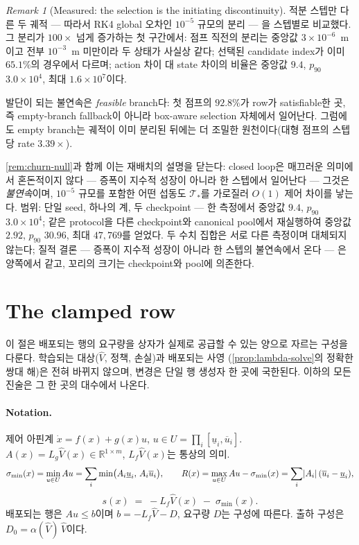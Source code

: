 \documentclass[11pt]{article}
\theoremstyle{plain}
\theoremstyle{definition}
\theoremstyle{remark}
\newtheorem{remark}[theorem]{Remark}
\newcommand{\R}{\mathbb{R}}
\DeclarePairedDelimiter{\abs}{\lvert}{\rvert}
\newcommand{\calT}{\mathcal{T}}
\newcommand{\Vhat}{\widehat V}
\newcommand{\Lg}{L_g}
\newcommand{\Lf}{L_f}
\begin{document}
\begin{remark}[Measured: the selection is the initiating discontinuity]\label{rem:sel-measured}
적분 스텝만 다른 두 궤적 --- 따라서 RK4 global 오차인 $10^{-5}$ 규모의 분리 --- 을 스텝별로
비교했다. 그 분리가 $100\times$ 넘게 증가하는 첫 구간에서: 점프 직전의 분리는 중앙값
$3\times10^{-6}$~m이고 전부 $10^{-3}$~m 미만이라 두 상태가 사실상 같다; 선택된 candidate index가
이미 $65.1\%$의 경우에서 다르며; action 차이 대 state 차이의 비율은 중앙값 $9.4$, $p_{90}$
$3.0\times10^4$, 최대 $1.6\times10^7$이다.

발단이 되는 불연속은 \emph{feasible} branch다: 첫 점프의 $92.8\%$가 row가 satisfiable한 곳, 즉
empty-branch fallback이 아니라 box-aware selection 자체에서 일어난다. 그럼에도 empty branch는 궤적이
이미 분리된 뒤에는 더 조밀한 원천이다(대형 점프의 스텝당 rate $3.39\times$).

\cref{rem:churn-null}과 함께 이는 재배치의 설명을 닫는다: closed loop은 매끄러운 의미에서 혼돈적이지
않다 --- 증폭이 지수적 성장이 아니라 한 스텝에서 일어난다 --- 그것은 \emph{불연속}이며, $10^{-5}$
규모를 포함한 어떤 섭동도 $\calT_\ast$를 가로질러 $O(1)$ 제어 차이를 낳는다. 범위: 단일 seed,
하나의 계, 두 checkpoint --- 한 측정에서 중앙값 $9.4$, $p_{90}$ $3.0\times10^4$; 같은 protocol을
다른 checkpoint와 canonical pool에서 재실행하여 중앙값 $2.92$, $p_{90}$ $30.96$, 최대 $47{,}769$를
얻었다. 두 수치 집합은 서로 다른 측정이며 대체되지 않는다; 질적 결론 --- 증폭이 지수적 성장이
아니라 한 스텝의 불연속에서 온다 --- 은 양쪽에서 같고, 꼬리의 크기는 checkpoint와 pool에 의존한다.
\end{remark}

\section{The clamped row}\label{sec:clamp}

이 절은 배포되는 행의 요구량을 상자가 실제로 공급할 수 있는 양으로 자르는
구성을 다룬다. 학습되는 대상($\Vhat$, 정책, 손실)과 배포되는 사영
(\cref{prop:lambda-solve}의 정확한 쌍대 해)은 전혀 바뀌지 않으며, 변경은 단일 행
생성자 한 곳에 국한된다. 이하의 모든 진술은 그 한 곳의 대수에서 나온다.

\paragraph{Notation.}
제어 아핀계 $\dot x = f(x) + g(x)u$, $u \in U = \prod_i [\underline u_i, \overline u_i]$.
$A(x) = \Lg \Vhat(x) \in \R^{1 \times m}$, $\Lf \Vhat(x)$는 통상의 의미.
\[
\sigma_{\min}(x) = \min_{u \in U} A u = \sum_i \min\!\big(A_i \underline u_i,\, A_i \overline u_i\big),
\qquad
R(x) = \max_{u\in U} Au - \sigma_{\min}(x) = \sum_i \abs{A_i}\,(\overline u_i - \underline u_i),
\]
\[
s(x) \;=\; -\Lf \Vhat(x) \;-\; \sigma_{\min}(x).
\]
배포되는 행은 $A u \le b$이며 $b = -\Lf\Vhat - D$, 요구량 $D$는 구성에 따른다.
출하 구성은 $D_0 = \alpha(\Vhat)\,\Vhat$이다.
\end{document}
